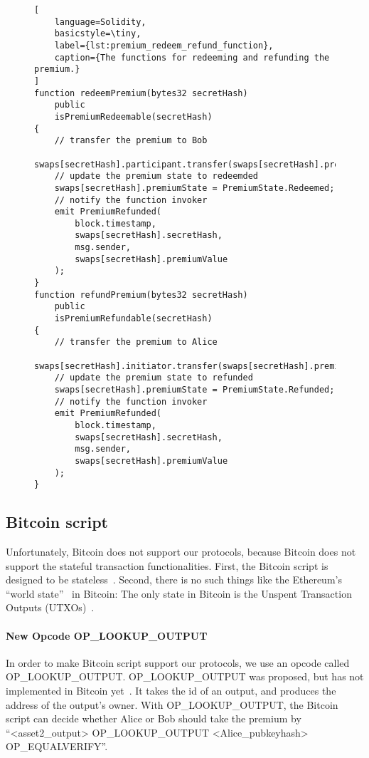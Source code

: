 \begin{figure}[htb]
\begin{lstlisting}[
    language=Solidity, 
    basicstyle=\tiny,
    label={lst:premium_redeem_refund_function},
    caption={The functions for redeeming and refunding the premium.}
]
function redeemPremium(bytes32 secretHash)
    public
    isPremiumRedeemable(secretHash)
{
    // transfer the premium to Bob
    swaps[secretHash].participant.transfer(swaps[secretHash].premiumValue);
    // update the premium state to redeemded
    swaps[secretHash].premiumState = PremiumState.Redeemed;
    // notify the function invoker
    emit PremiumRefunded(
        block.timestamp,
        swaps[secretHash].secretHash,
        msg.sender,
        swaps[secretHash].premiumValue
    );
}
function refundPremium(bytes32 secretHash)
    public
    isPremiumRefundable(secretHash)
{
    // transfer the premium to Alice
    swaps[secretHash].initiator.transfer(swaps[secretHash].premiumValue);
    // update the premium state to refunded
    swaps[secretHash].premiumState = PremiumState.Refunded;
    // notify the function invoker
    emit PremiumRefunded(
        block.timestamp,
        swaps[secretHash].secretHash,
        msg.sender,
        swaps[secretHash].premiumValue
    );
}
\end{lstlisting}
\end{figure}

\subsection{Bitcoin script}

Unfortunately, Bitcoin does not support our protocols, because Bitcoin does not support the stateful transaction functionalities.
First, the Bitcoin script is designed to be stateless~\cite{okupski2014bitcoin}.
Second, there is no such things like the Ethereum's ``world state''~\cite{wood2014ethereum} in Bitcoin:
The only state in Bitcoin is the Unspent Transaction Outputs (UTXOs)~\cite{nakamoto2008bitcoin}.


\paragraph{New Opcode OP\_LOOKUP\_OUTPUT}
In order to make Bitcoin script support our protocols, we use an opcode called OP\_LOOKUP\_OUTPUT.
OP\_LOOKUP\_OUTPUT was proposed, but has not implemented in Bitcoin yet~\cite{op-lookup-output-origin}.
It takes the id of an output, and produces the address of the output's owner.
With OP\_LOOKUP\_OUTPUT, the Bitcoin script can decide whether Alice or Bob should take the premium by
``<asset2\_output> OP\_LOOKUP\_OUTPUT <Alice\_pubkeyhash> OP\_EQUALVERIFY''.

